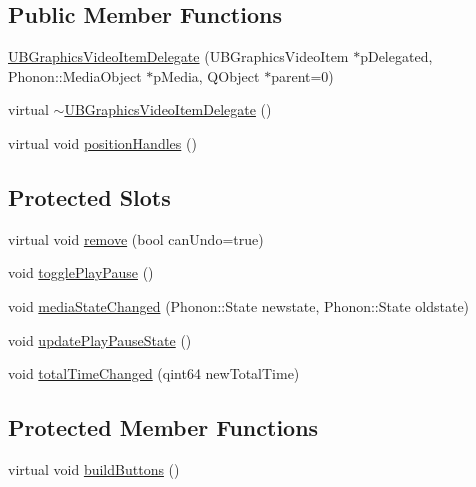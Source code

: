 \subsection*{Public Member Functions}
\begin{DoxyCompactItemize}
\item 
\hyperlink{class_u_b_graphics_video_item_delegate_aadf7d709dbcce2d650e48b22c75e1af4}{U\-B\-Graphics\-Video\-Item\-Delegate} (U\-B\-Graphics\-Video\-Item $\ast$p\-Delegated, Phonon\-::\-Media\-Object $\ast$p\-Media, Q\-Object $\ast$parent=0)
\item 
virtual \hyperlink{class_u_b_graphics_video_item_delegate_a8c9baad288d82af2670b49b2adabb7d9}{$\sim$\-U\-B\-Graphics\-Video\-Item\-Delegate} ()
\item 
virtual void \hyperlink{class_u_b_graphics_video_item_delegate_aeb9b858358a46026f500f9da791f7aaf}{position\-Handles} ()
\end{DoxyCompactItemize}
\subsection*{Protected Slots}
\begin{DoxyCompactItemize}
\item 
virtual void \hyperlink{class_u_b_graphics_video_item_delegate_a4942d54cd7fbb1f6eca3c5d94dfdba19}{remove} (bool can\-Undo=true)
\item 
void \hyperlink{class_u_b_graphics_video_item_delegate_a02d286833e7af132f2ff2fd07ba4fe53}{toggle\-Play\-Pause} ()
\item 
void \hyperlink{class_u_b_graphics_video_item_delegate_ae207ca87daa5d3b6538800280d6e4c5f}{media\-State\-Changed} (Phonon\-::\-State newstate, Phonon\-::\-State oldstate)
\item 
void \hyperlink{class_u_b_graphics_video_item_delegate_a2fbd1a023f7a9ee3669f2c2b7850722c}{update\-Play\-Pause\-State} ()
\item 
void \hyperlink{class_u_b_graphics_video_item_delegate_a06e0f6437d99d95697c5b0479e05973c}{total\-Time\-Changed} (qint64 new\-Total\-Time)
\end{DoxyCompactItemize}
\subsection*{Protected Member Functions}
\begin{DoxyCompactItemize}
\item 
virtual void \hyperlink{class_u_b_graphics_video_item_delegate_a1ae8bd8bb12ca6c81e82eed663bc041b}{build\-Buttons} ()
\end{DoxyCompactItemize}
